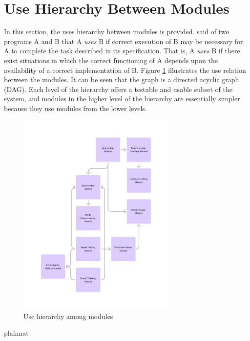 \documentclass[12pt, titlepage]{article}
\begin{document}
\section{Use Hierarchy Between Modules} \label{SecUse}

In this section, the uses hierarchy between modules is
provided. \citet{Parnas1978} said of two programs A and B that A {\em uses} B if
correct execution of B may be necessary for A to complete the task described in
its specification. That is, A {\em uses} B if there exist situations in which
the correct functioning of A depends upon the availability of a correct
implementation of B.  Figure \ref{FigUH} illustrates the use relation between
the modules. It can be seen that the graph is a directed acyclic graph
(DAG). Each level of the hierarchy offers a testable and usable subset of the
system, and modules in the higher level of the hierarchy are essentially simpler
because they use modules from the lower levels.



\begin{figure}[H]
\centering
\includegraphics[width=0.7\textwidth]{UsesHierarchy.png}
\caption{Use hierarchy among modules}
\label{FigUH}
\end{figure}

 {plainnat}


\newpage{}
\end{document}
